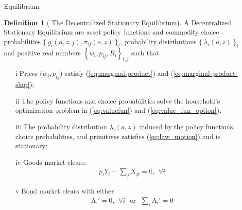 \documentclass[9pt,pdftex,aspectratio=1610]{beamer}
\theoremstyle{definition}
\newtheorem{df}{Definition}
\begin{document}
\begin{frame}[t]{Equilibrium}
\vspace{-.25cm}
\smallskip
{\small
\begin{df}[ {\normalsize The Decentralized Stationary Equilibrium}] \normalfont A Decentralized Stationary Equilibrium are asset policy functions and commodity choice probabilities $\{\  g_{i}(a, z, j), \pi_{ij}(a, z) \ \}_{i}$, probability distributions $\{ \ \lambda_i(a, z) \ \}_{i}$ and positive real numbers $\left \{w_i, p_{ij}, R_i\right \}_{i,j}$ such that
\begin{itemize}
\item[i]  Prices ($w_i, p_{ij}$) satisfy (\ref{eq:marginal-product}) and (\ref{eq:marginal-product-ship});
\item[ii] The policy functions and choice probabilities solve the household's optimization problem in (\ref{eq:valuefun}) and (\ref{eq:value_fun_option});
\item[iii] The probability distribution $\lambda_i(a, z)$ induced by the policy functions, choice probabilities, and primitives satisfies (\ref{eq:law_motion}) and is stationary;
\item[iv] Goods market clears:
\begin{align}
p_{i} Y_{i} - \sum_{j}  X_{ji} = 0, \ \ \forall i
\end{align}
\item[v] Bond market clears with either
\begin{align}
\mathrm{A_i'} = 0, \ \ \forall i \ \ \ \mbox{or} \ \ \ \sum_{i}\mathrm{A_i'} = 0
\label{eq:fa-condition}
\end{align}
\end{itemize}
\end{df}
}
\end{frame}

\end{document}
